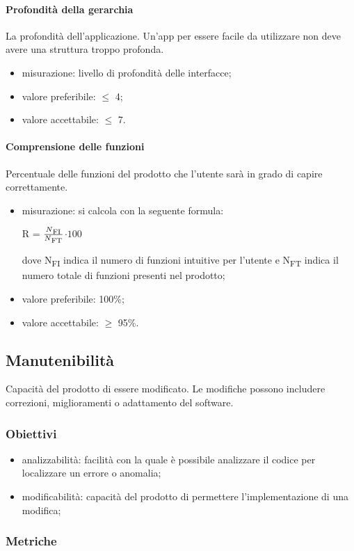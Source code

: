 			\paragraph{Profondità della gerarchia}
			La profondità dell'applicazione. Un'app per essere facile da utilizzare non deve avere una struttura troppo profonda.
			\begin{itemize}
			\item misurazione: livello di profondità delle interfacce;
			\item valore preferibile: $\leq$ 4;
			\item valore accettabile: $\leq$ 7.
			\end{itemize}
			\paragraph{Comprensione delle funzioni}
			Percentuale delle funzioni del prodotto che l'utente sarà in grado di capire correttamente.
			\begin{itemize}
				\item misurazione: si calcola con la seguente formula: \\
			\centerline{ R =  \(\frac{N\textsubscript{FI}}{N\textsubscript{FT}} \)$ \cdot 100$ }
			dove N\textsubscript{FI} indica il numero di funzioni intuitive per l'utente e N\textsubscript{FT} indica il numero totale di funzioni presenti nel prodotto;
				\item valore preferibile: 100\%;
				\item valore accettabile: $\geq$ 95\%.
			\end{itemize}
	\subsection{Manutenibilità}
	Capacità del prodotto di essere modificato. Le modifiche possono includere correzioni, miglioramenti o adattamento del software.
		\subsubsection{Obiettivi}
		\begin{itemize}
			\item analizzabilità: facilità con la quale è possibile analizzare il codice per localizzare un errore o anomalia;
			\item modificabilità: capacità del prodotto di permettere l'implementazione di una modifica;
		\end{itemize}
		\subsubsection{Metriche}
